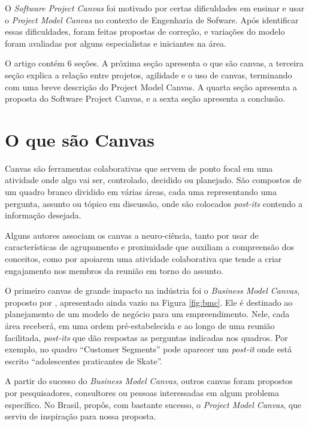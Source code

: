 \documentclass{article}
\begin{document}
O \textit{Software Project Canvas} foi motivado por certas dificuldades em ensinar e usar o \textit{Project Model Canvas} no contexto de Engenharia de Sofware. Após identificar essas dificuldades, foram feitas propostas de correção, e variações do modelo foram avaliadas por alguns especialistas e iniciantes na área. 

O artigo contém 6 seções. A próxima seção apresenta o que são canvas, a terceira seção explica a relação entre projetos, agilidade e o uso de canvas, terminando com uma breve descrição do Project Model Canvas. A quarta seção apresenta a proposta do Software Project Canvas, e a sexta seção apresenta a conclusão.

\section{O que são Canvas}

Canvas são ferramentas colaborativas que servem de ponto focal em uma atividade onde algo vai ser, controlado, decidido ou planejado. São compostos de um quadro branco dividido em várias áreas, cada uma representando uma pergunta, assunto ou tópico em discussão, onde são colocados \textit{post-its} contendo a informação desejada. 

Alguns autores\citep{finocchio:2013} associam os canvas a neuro-ciência, tanto por usar de características de agrupamento e proximidade que auxiliam a compreensão dos conceitos, como por apoiarem uma atividade colaborativa que tende a criar engajamento nos membros da reunião em torno do assunto.

O primeiro canvas de grande impacto na indústria foi o \textit{Business Model Canvas}, proposto por \citet{osterwalder2010business}, apresentado ainda vazio na Figura \ref{fig:bmc}. Ele é destinado ao planejamento de um modelo de negócio para um empreendimento. Nele, cada área receberá, em uma ordem pré-estabelecida e ao longo de uma reunião facilitada, \textit{post-its} que dão respostas as perguntas indicadas nos quadros. Por exemplo, no quadro ``Customer Segments'' pode aparecer um \textit{post-it} onde está escrito ``adolescentes praticantes de Skate''.

A partir do sucesso do \textit{Business Model Canvas},  outros canvas foram propostos por pesquisadores, consultores ou pessoas interessadas em algum problema específico. No Brasil, \citeauthor{finocchio:2013} propôs, com bastante sucesso, o \textit{Project Model Canvas}\citep{finocchio:2013}, que serviu de inspiração para nossa proposta. 
\end{document}

